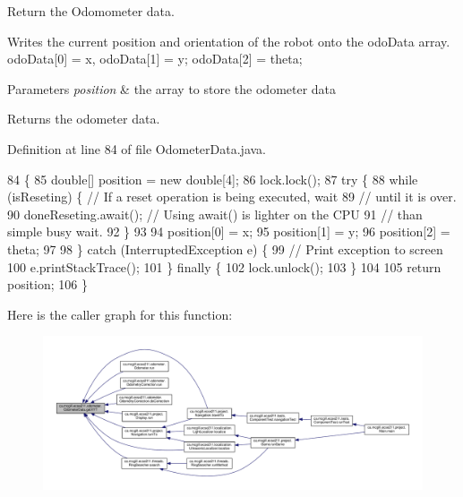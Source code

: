 Return the Odomometer data. 

Writes the current position and orientation of the robot onto the odo\+Data array. odo\+Data\mbox{[}0\mbox{]} = x, odo\+Data\mbox{[}1\mbox{]} = y; odo\+Data\mbox{[}2\mbox{]} = theta;


\begin{DoxyParams}{Parameters}
{\em position} & the array to store the odometer data \\
\hline
\end{DoxyParams}
\begin{DoxyReturn}{Returns}
the odometer data. 
\end{DoxyReturn}


Definition at line 84 of file Odometer\+Data.\+java.


\begin{DoxyCode}
84                            \{
85     \textcolor{keywordtype}{double}[] position = \textcolor{keyword}{new} \textcolor{keywordtype}{double}[4];
86     lock.lock();
87     \textcolor{keywordflow}{try} \{
88       \textcolor{keywordflow}{while} (isReseting) \{ \textcolor{comment}{// If a reset operation is being executed, wait}
89         \textcolor{comment}{// until it is over.}
90         doneReseting.await(); \textcolor{comment}{// Using await() is lighter on the CPU}
91         \textcolor{comment}{// than simple busy wait.}
92       \}
93 
94       position[0] = x;
95       position[1] = y;
96       position[2] = theta;
97 
98     \} \textcolor{keywordflow}{catch} (InterruptedException e) \{
99       \textcolor{comment}{// Print exception to screen}
100       e.printStackTrace();
101     \} \textcolor{keywordflow}{finally} \{
102       lock.unlock();
103     \}
104 
105     \textcolor{keywordflow}{return} position;
106   \}
\end{DoxyCode}
Here is the caller graph for this function\+:
\nopagebreak
\begin{figure}[H]
\begin{center}
\leavevmode
\includegraphics[width=350pt]{classca_1_1mcgill_1_1ecse211_1_1odometer_1_1_odometer_data_a8f40f0264c68f0cbed4fff1723ae7863_icgraph}
\end{center}
\end{figure}
\mbox{\label{classca_1_1mcgill_1_1ecse211_1_1odometer_1_1_odometer_data_a419b8f07c2c5374411c8e62298e9a402}} 
